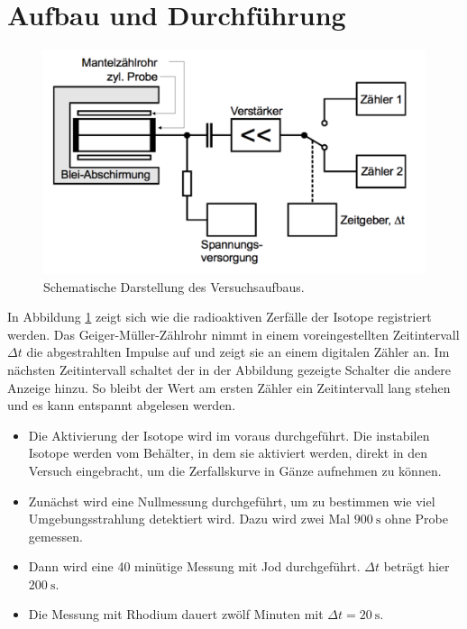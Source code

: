  \section{Aufbau und Durchführung}
\label{sec:Durchführung}

\begin{figure}
  \centering
  \includegraphics[width = \textwidth]{Pics/zaehleraufbau.pdf}
  \caption{Schematische Darstellung des Versuchsaufbaus.\cite{anleitung}}
  \label{fig:aufbau}
\end{figure}

In Abbildung \ref{fig:aufbau} zeigt sich wie die radioaktiven Zerfälle der Isotope
registriert werden. Das Geiger-Müller-Zählrohr nimmt in einem voreingestellten Zeitintervall
$\Delta t$ die abgestrahlten Impulse auf und zeigt sie an einem digitalen Zähler an.
Im nächsten Zeitintervall schaltet der in der Abbildung gezeigte Schalter die andere Anzeige
hinzu. So bleibt der Wert am ersten Zähler ein Zeitintervall lang stehen und es kann
entspannt abgelesen werden.

\begin{itemize}
  \item Die Aktivierung der Isotope wird im voraus durchgeführt. Die instabilen Isotope
  werden vom Behälter, in dem sie aktiviert werden,
  direkt in den Versuch eingebracht, um die Zerfallskurve in Gänze aufnehmen zu können.
  \item Zunächst wird eine Nullmessung durchgeführt, um zu bestimmen wie viel
  Umgebungsstrahlung detektiert wird. Dazu wird zwei Mal $\SI{900}{\second}$ ohne
  Probe gemessen.
  \item Dann wird eine 40 minütige Messung mit Jod durchgeführt. $\Delta t$
  beträgt hier $\SI{200}{\second}$.
  \item Die Messung mit Rhodium dauert zwölf Minuten mit $\Delta t = \SI{20}{\second}$.

\end{itemize}
